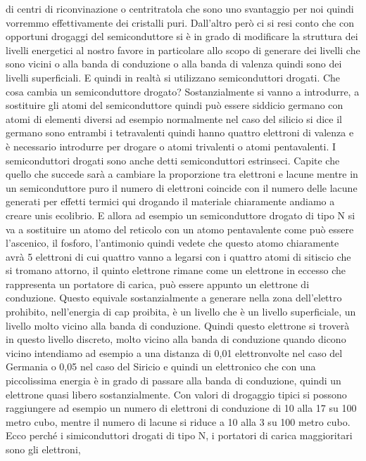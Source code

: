 {di centri di riconvinazione o centritratola che sono uno svantaggio per noi quindi vorremmo effettivamente dei cristalli puri. Dall'altro però ci si resi conto che con opportuni drogaggi del semiconduttore si è in grado di modificare la struttura dei livelli energetici al nostro favore in particolare allo scopo di generare dei livelli che sono vicini o alla banda di conduzione o alla banda di valenza quindi sono dei livelli superficiali. E quindi in realtà si utilizzano semiconduttori drogati. Che cosa cambia un semiconduttore drogato? Sostanzialmente si vanno a introdurre, a sostituire gli atomi del semiconduttore quindi può essere siddicio germano con atomi di elementi diversi ad esempio normalmente nel caso del silicio si dice il germano sono entrambi i tetravalenti quindi hanno quattro elettroni di valenza e è necessario introdurre per drogare o atomi trivalenti o atomi pentavalenti. I semiconduttori drogati sono anche detti semiconduttori estrinseci. Capite che quello che succede sarà a cambiare la proporzione tra elettroni e lacune mentre in un semiconduttore puro il numero di elettroni coincide con il numero delle lacune generati per effetti termici qui drogando il materiale chiaramente andiamo a creare unis ecolibrio. E allora ad esempio un semiconduttore drogato di tipo N si va a sostituire un atomo del reticolo con un atomo pentavalente come può essere l'ascenico, il fosforo, l'antimonio quindi vedete che questo atomo chiaramente avrà 5 elettroni di cui quattro vanno a legarsi con i quattro atomi di sitiscio che si tromano attorno, il quinto elettrone rimane come un elettrone in eccesso che rappresenta un portatore di carica, può essere appunto un elettrone di conduzione. Questo equivale sostanzialmente a generare nella zona dell'elettro prohibito, nell'energia di cap proibita, è un livello che è un livello superficiale, un livello molto vicino alla banda di conduzione. Quindi questo elettrone si troverà in questo livello discreto, molto vicino alla banda di conduzione quando dicono vicino intendiamo ad esempio a una distanza di 0,01 elettronvolte nel caso del Germania o 0,05 nel caso del Siricio e quindi un elettronico che con una piccolissima energia è in grado di passare alla banda di conduzione, quindi un elettrone quasi libero sostanzialmente. Con valori di drogaggio tipici si possono raggiungere ad esempio un numero di elettroni di conduzione di 10 alla 17 su 100 metro cubo, mentre il numero di lacune si riduce a 10 alla 3 su 100 metro cubo. Ecco perché i simiconduttori drogati di tipo N, i portatori di carica maggioritari sono gli elettroni, 

}
